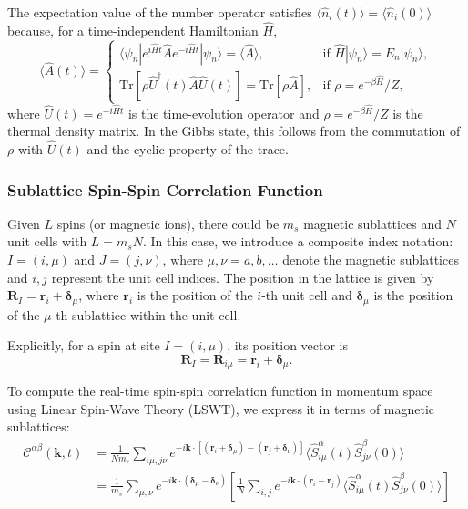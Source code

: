 \documentclass[aps, prx, nofootinbib, superscriptaddress]{revtex4-2}
\begin{document}
The expectation value of the number operator satisfies $\langle \hat{n}_i(t) \rangle = \langle \hat{n}_i(0) \rangle$ because, for a time-independent Hamiltonian $\hat{H}$,
\begin{equation}
    \langle \hat{A}(t) \rangle = 
    \begin{cases}
        \langle \psi_n | e^{i \hat{H} t} \hat{A} e^{-i \hat{H} t} | \psi_n \rangle = \langle \hat{A} \rangle, & \text{if } \hat{H} | \psi_n \rangle = E_n | \psi_n \rangle, \\
        \mathrm{Tr} [ \rho \hat{U}^{\dagger}(t) \hat{A} \hat{U}(t) ] = \mathrm{Tr} [ \rho \hat{A} ], & \text{if } \rho = e^{-\beta \hat{H}} / Z,
    \end{cases}
\end{equation}
where $\hat{U}(t) = e^{-i \hat{H} t}$ is the time-evolution operator and $\rho = e^{-\beta \hat{H}} / Z$ is the thermal density matrix. In the Gibbs state, this follows from the commutation of $\rho$ with $\hat{U}(t)$ and the cyclic property of the trace.





\subsubsection{Sublattice Spin-Spin Correlation Function}

Given $L$ spins (or magnetic ions), there could be $m_{s}$ magnetic sublattices and $N$ unit cells with $L = m_{s}N$. 
In this case, we introduce a composite index notation: $I = (i, \mu)$ and $J = (j, \nu)$, where $\mu, \nu = a, b, \dots$ denote the magnetic sublattices and $i, j$ represent the unit cell indices. The position in the lattice is given by $\mathbf{R}_{I} = \mathbf{r}_{i} + \boldsymbol{\delta}_{\mu}$, where $\mathbf{r}_i$ is the position of the $i$-th unit cell and $\boldsymbol{\delta}_\mu$ is the position of the $\mu$-th sublattice within the unit cell.

Explicitly, for a spin at site $I = (i, \mu)$, its position vector is
\begin{equation}
    \mathbf{R}_{I} = \mathbf{R}_{i\mu} = \mathbf{r}_{i} + \boldsymbol{\delta}_{\mu}.
\end{equation}

To compute the real-time spin-spin correlation function in momentum space using Linear Spin-Wave Theory (LSWT), we express it in terms of magnetic sublattices:
\begin{align}
    \mathcal{C}^{\alpha\beta}(\mathbf{k}, t) 
    &= \frac{1}{Nm_{s}} \sum_{i\mu,j\nu} e^{-i\mathbf{k} \cdot [(\mathbf{r}_{i} + \boldsymbol{\delta}_{\mu}) - (\mathbf{r}_{j} + \boldsymbol{\delta}_{\nu})]} \langle \hat{S}_{i\mu}^{\alpha}(t) \hat{S}_{j\nu}^{\beta}(0) \rangle \\
    &= \frac{1}{m_{s}} \sum_{\mu,\nu} e^{-i\mathbf{k} \cdot (\boldsymbol{\delta}_{\mu} - \boldsymbol{\delta}_{\nu})} 
    \left[ 
    \frac{1}{N} \sum_{i,j} e^{-i\mathbf{k} \cdot (\mathbf{r}_{i} - \mathbf{r}_{j})} 
    \langle \hat{S}_{i\mu}^{\alpha}(t) \hat{S}_{j\nu}^{\beta}(0) \rangle \right] 
\end{align}
\end{document}

